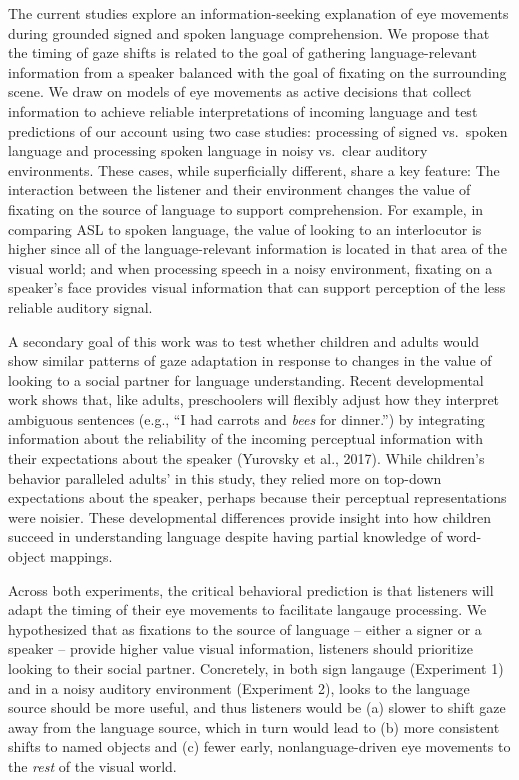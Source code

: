 \documentclass[,man,floatsintext]{apa6}
\begin{document}
The current studies explore an information-seeking explanation of eye
movements during grounded signed and spoken language comprehension. We
propose that the timing of gaze shifts is related to the goal of
gathering language-relevant information from a speaker balanced with the
goal of fixating on the surrounding scene. We draw on models of eye
movements as active decisions that collect information to achieve
reliable interpretations of incoming language and test predictions of
our account using two case studies: processing of signed vs.~spoken
language and processing spoken language in noisy vs.~clear auditory
environments. These cases, while superficially different, share a key
feature: The interaction between the listener and their environment
changes the value of fixating on the source of language to support
comprehension. For example, in comparing ASL to spoken language, the
value of looking to an interlocutor is higher since all of the
language-relevant information is located in that area of the visual
world; and when processing speech in a noisy environment, fixating on a
speaker's face provides visual information that can support perception
of the less reliable auditory signal.

A secondary goal of this work was to test whether children and adults
would show similar patterns of gaze adaptation in response to changes in
the value of looking to a social partner for language understanding.
Recent developmental work shows that, like adults, preschoolers will
flexibly adjust how they interpret ambiguous sentences (e.g., \enquote{I
had carrots and \emph{bees} for dinner.}) by integrating information
about the reliability of the incoming perceptual information with their
expectations about the speaker (Yurovsky et al., 2017). While children's
behavior paralleled adults' in this study, they relied more on top-down
expectations about the speaker, perhaps because their perceptual
representations were noisier. These developmental differences provide
insight into how children succeed in understanding language despite
having partial knowledge of word-object mappings.

Across both experiments, the critical behavioral prediction is that
listeners will adapt the timing of their eye movements to facilitate
langauge processing. We hypothesized that as fixations to the source of
language -- either a signer or a speaker -- provide higher value visual
information, listeners should prioritize looking to their social
partner. Concretely, in both sign langauge (Experiment 1) and in a noisy
auditory environment (Experiment 2), looks to the language source should
be more useful, and thus listeners would be (a) slower to shift gaze
away from the language source, which in turn would lead to (b) more
consistent shifts to named objects and (c) fewer early,
nonlanguage-driven eye movements to the \emph{rest} of the visual world.
\end{document}
